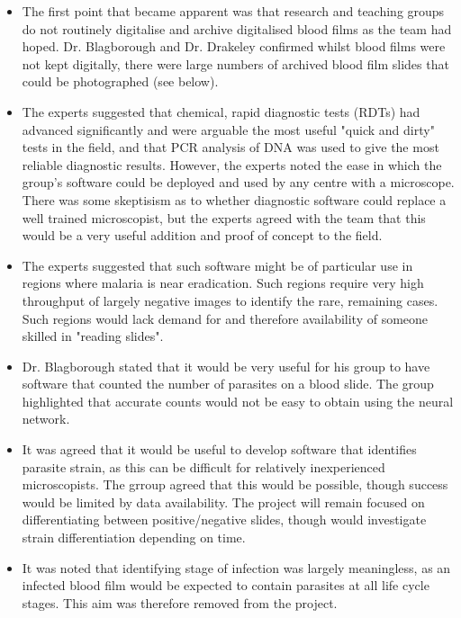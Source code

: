 \documentclass[a4paper,11pt]{article}
\begin{document}
\begin{itemize}
	\item The first point that became apparent was that research and teaching groups do not routinely digitalise and archive digitalised blood films as the team had hoped. Dr. Blagborough and Dr. Drakeley confirmed whilst blood films were not kept digitally, there were large numbers of archived blood film slides that could be photographed (see below). 

	\item The experts suggested that chemical, rapid diagnostic tests (RDTs) had advanced significantly and were arguable the most useful "quick and dirty" tests in the field, and that PCR analysis of DNA was used to give the most reliable diagnostic results. However, the experts noted the ease in which the group's software could be deployed and used by any centre with a microscope. There was some skeptisism as to whether diagnostic software could replace a well trained microscopist, but the experts agreed with the team that this would be a very useful addition and proof of concept to the field.

	\item The experts suggested that such software might be of particular use in regions where malaria is near eradication. Such regions require very high throughput of largely negative images to identify the rare, remaining cases. Such regions would lack demand for and therefore availability of someone skilled in "reading slides".

	\item Dr. Blagborough stated that it would be very useful for his group to have software that counted the number of parasites on a blood slide. The group highlighted that accurate counts would not be easy to obtain using the neural network.

	\item It was agreed that it would be useful to develop software that identifies parasite strain, as this can be difficult for relatively inexperienced microscopists. The grroup agreed that this would be possible, though success would be limited by data availability. The project will remain focused on differentiating between positive/negative slides, though would investigate strain differentiation depending on time.

	\item It was noted that identifying stage of infection was largely meaningless, as an infected blood film would be expected to contain parasites at all life cycle stages. This aim was therefore removed from the project.


\end{itemize}
\end{document}
